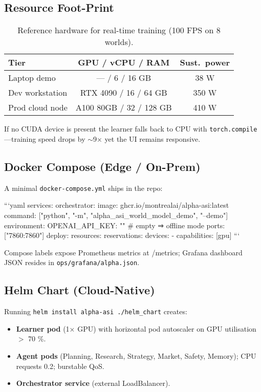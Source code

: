 \subsection{Resource Foot-Print}

\begin{table}[h]\centering
\caption{Reference hardware for real-time training (100 FPS on 8 worlds).}
\label{tab:hw}
\begin{tabular}{@{}lcc@{}}
\toprule
\textbf{Tier} & \textbf{GPU / vCPU / RAM} & \textbf{Sust.\ power}\\
\midrule
Laptop demo           & --- / 6 / 16 GB & 38 W  \\
Dev workstation       & RTX 4090 / 16 / 64 GB & 350 W \\
Prod cloud node       & A100 80GB / 32 / 128 GB & 410 W \\
\bottomrule
\end{tabular}
\end{table}

If no CUDA device is present the learner falls back to CPU with
\texttt{torch.compile}—training speed drops by $\sim$9× yet the UI remains
responsive.

\subsection{Docker Compose (Edge / On-Prem)}

A minimal \texttt{docker-compose.yml} ships in the repo:

```yaml
services:
  orchestrator:
    image: ghcr.io/montrealai/alpha-asi:latest
    command: ["python", "-m", "alpha_asi_world_model_demo", "--demo"]
    environment:
      OPENAI_API_KEY: ""            # empty ⇒ offline mode
    ports: ["7860:7860"]
    deploy:
      resources:
        reservations:
          devices:
          - capabilities: [gpu]
```

Compose labels expose Prometheus metrics at /metrics;
Grafana dashboard JSON resides in \texttt{ops/grafana/alpha.json}.

\subsection{Helm Chart (Cloud-Native)}

Running \verb|helm install alpha-asi ./helm_chart| creates:

\begin{itemize}
  \item \textbf{Learner pod} (1× GPU) with horizontal pod autoscaler on GPU utilisation~$>$ 70 \%.
  \item \textbf{Agent pods} (Planning, Research, Strategy, Market, Safety, Memory); CPU requests 0.2; burstable QoS.
  \item \textbf{Orchestrator service} (external LoadBalancer).
\end{itemize}

